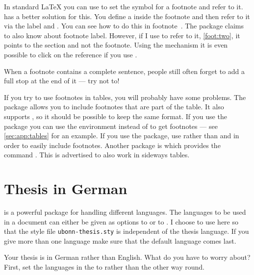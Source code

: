 In standard \LaTeX{} you can use 
to set the symbol for a footnote and refer to it.
\KOMAScript{} has a better solution for this.
You define a  inside the footnote and
then refer to it via the label and .
You can see how to do this in footnote~.
The  package claims to also know about footnote label.
However, if I use  to refer to it, \cref{foot:two},
it points to the section and not the footnote.
Using the  mechanism it is even
possible to click on the reference if you use .

When a footnote contains a complete sentence, people still often
forget to add a full stop at the end of it --- try not to!

If you try to use footnotes in tables, you will probably have some
problems. The  package allows you to include footnotes
that are part of the table. It also supports , so it
should be possible to keep the same format. If you use the package
 you can use the environment  
instead of  to get footnotes
--- see \cref{sec:app:tables} for an example. 
If you use the  package, use 
rather than  and  in order to easily include
footnotes.
Another package is  which provides the command
. This is advertised to also work in sideways tables.


\section{Thesis in German}%
\label{sec:layout:german}

 is a powerful package for handling different
languages. The languages to be used in a document can either be given
as options to  or to . I choose to
use  here so that the style file
\texttt{ubonn-thesis.sty} is independent of the thesis language. If
you give more than one language make sure that the default language
comes last.

Your thesis is in German rather than English. What do you have to
worry about? First, set the languages in the  to
 rather than the other way round.

